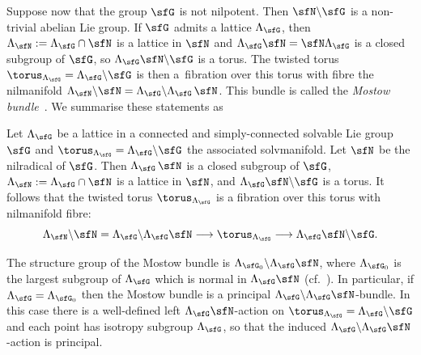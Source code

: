Suppose now that the group $\sfG$ is not nilpotent. Then $\sfN\backslash\sfG$
is a non-trivial abelian Lie group. If $\sfG$ admits a lattice $\Lambda_\sfG$, then
$\Lambda_{\sfN}:=\Lambda_\sfG\cap\sfN$ is a lattice in $\sfN$ and
$\Lambda_\sfG \sfN=\sfN \Lambda_\sfG$ is a closed subgroup of $\sfG$, so
$\Lambda_\sfG \sfN\backslash\sfG$ is a torus. The twisted torus
$\torus_{\Lambda_\sfG}=\Lambda_\sfG\backslash\sfG$ is then a~fibration over this torus with fibre
the nilmanifold $\Lambda_{\sfN}\backslash\sfN=\Lambda_\sfG\backslash \Lambda_\sfG\,\sfN$. This
bundle is called the \emph{Mostow bundle}~\cite{Mostow1954}. We summarise these statements as
\begin{Theorem}
\label{thm:Mostowbundle}
Let ${\Lambda_\sfG}$ be a lattice in a connected and simply-connected
solvable Lie group $\sfG$ and $\torus_{\Lambda_\sfG} =
\Lambda_\sfG\backslash\sfG$ the associated solvmanifold. Let $\sfN$ be the nilradical
 of $\sfG$.
Then $\Lambda_\sfG\,\sfN$ is a closed subgroup of $\sfG$,
$\Lambda_{\sfN}:=\Lambda_\sfG\cap\sfN$ is a lattice in
$\sfN$, and $\Lambda_\sfG \sfN\backslash\sfG$ is a torus.
It follows that the twisted torus
$\torus_{\Lambda_\sfG}$ is a fibration over this torus with
nilmanifold fibre:
\[
\Lambda_{\sfN}\backslash\sfN=\Lambda_\sfG\backslash\Lambda_\sfG \sfN
\longrightarrow
\torus_{\Lambda_\sfG}\longrightarrow \Lambda_\sfG \sfN\backslash\sfG .
\]
\end{Theorem}

\begin{Remark}\label{rem:Mostow}
The structure group of the Mostow bundle is
$\Lambda_{\sfG_0}\backslash\Lambda_\sfG \sfN$, where $\Lambda_{\sfG_0}$ is
the largest subgroup of $\Lambda_{\sfG}$ which is normal in
$\Lambda_\sfG \sfN$ (cf.~\cite{Bock2009}).
In particular, if $\Lambda_{\sfG}=\Lambda_{\sfG_0}$ then the Mostow bundle is
a principal $\Lambda_{\sfG}\backslash\Lambda_\sfG \sfN$-bundle. In
this case there is a well-defined left $\Lambda_\sfG \sfN$-action on $\torus_{\Lambda_\sfG} =
\Lambda_\sfG\backslash\sfG$ and each point has isotropy subgroup ${\Lambda_\sfG}$,
so that the induced $\Lambda_{\sfG}\backslash\Lambda_\sfG \sfN$-action
is principal.
\end{Remark}
